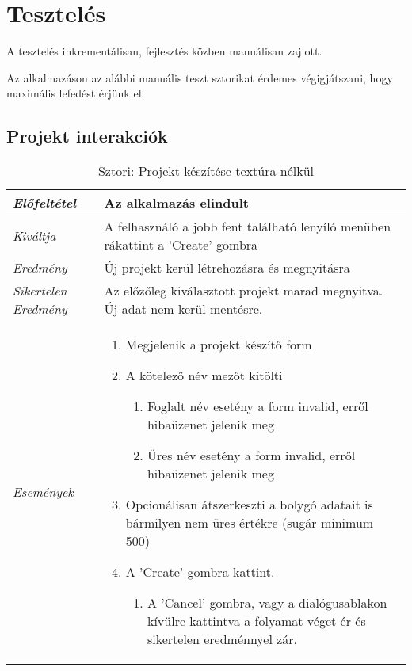 \chapter{Tesztelés}
\label{ch:intro}

A tesztelés inkrementálisan, fejlesztés közben manuálisan zajlott.

Az alkalmazáson az alábbi manuális teszt sztorikat érdemes végigjátszani, hogy maximális lefedést érjünk el:

\section{Projekt interakciók}

\begin{table}[H]
	\centering
	\begin{tabular}{ | m{} | m{} | }
		\hline
		\emph{Előfeltétel} & Az alkalmazás elindult  \\
		\hline
		\emph{Kiváltja} & A felhasználó a jobb fent található lenyíló menüben rákattint a 'Create' gombra \\
		\hline
		\emph{Eredmény} & Új projekt kerül létrehozásra és megnyitásra  \\
		\hline
		\emph{Sikertelen Eredmény} & Az előzőleg kiválasztott projekt marad megnyitva. Új adat nem kerül mentésre.  \\
		\hline
		\hline
		\emph{Események} &

		\begin{enumerate}
			\item Megjelenik a projekt készítő form
			\item A kötelező név mezőt kitölti
			\begin{enumerate}
				\item Foglalt név esetény a form invalid, erről hibaüzenet jelenik meg
				\item Üres név esetény a form invalid, erről hibaüzenet jelenik meg
			\end{enumerate}
			\item Opcionálisan átszerkeszti a bolygó adatait is bármilyen nem üres értékre (sugár minimum 500)
			\item A 'Create' gombra kattint.
			\begin{enumerate}
				\item A 'Cancel' gombra, vagy a dialógusablakon kívülre kattintva a folyamat véget ér és sikertelen eredménnyel zár.
			\end{enumerate}
		\end{enumerate}

		\\
		\hline
	\end{tabular}
	\caption{Sztori: Projekt készítése textúra nélkül}
	\label{tab:story-project-create}
\end{table}

